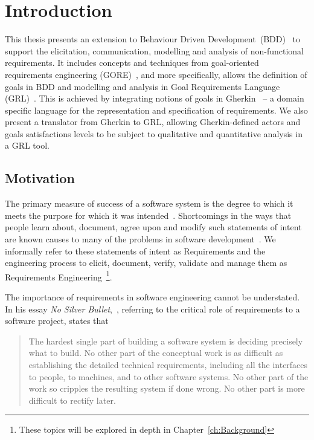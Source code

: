 \documentclass[dissertation,final]{softeng}
\begin{document}
\pagestyle{plain}
\setcounter{tocdepth}{2}

\tableofcontents

\listoffigures
\listoftables
\listoflistings

\pagestyle{myheadings}

\chapter{Introduction}
\label{ch:Introduction}
This thesis presents an extension to Behaviour Driven Development~(BDD)~\citep{North2006,Smart201410} to support the elicitation, communication, modelling and analysis of non-functional requirements. It includes concepts and techniques from goal-oriented requirements engineering (GORE)~\citep{Lamsweerde:2001wpba}, and more specifically, allows the definition of goals in BDD and modelling and analysis in Goal Requirements Language (GRL)~\citep{Amyot2010}. This is achieved by integrating notions of goals in Gherkin~\citep{wynne2012cucumber} -- a domain specific language for the representation and specification of requirements. We also present a translator from Gherkin to GRL, allowing Gherkin-defined actors and goals satisfactions levels to be subject to qualitative and quantitative analysis in a GRL tool.

\section{Motivation}
The primary measure of success of a software system is the degree to which it meets the purpose for which it was intended~\citep{Nuseibeh:2000ub}. Shortcomings in the ways that people learn about, document, agree upon and modify such statements of intent are known causes to many of the problems in software development~\citep{Wiegers2013}. We informally refer to these statements of intent as Requirements and the engineering process to elicit, document, verify, validate and manage them as Requirements Engineering~\footnote{These topics will be explored in depth in Chapter~\ref{ch:Background}}.

The importance of requirements in software engineering cannot be understated. In his essay \emph{No Silver Bullet},~\citet{Brooks1987}, referring to the critical role of requirements to a software project, states that 
\blockcquote{Brooks1987}{The hardest single part of building a software system is deciding precisely what to build. No other part of the conceptual work is as difficult as establishing the detailed technical requirements, including all the interfaces to people, to machines, and to other software systems. No other part of the work so cripples the resulting system if done wrong. No other part is more difficult to rectify later.}
\end{document}
